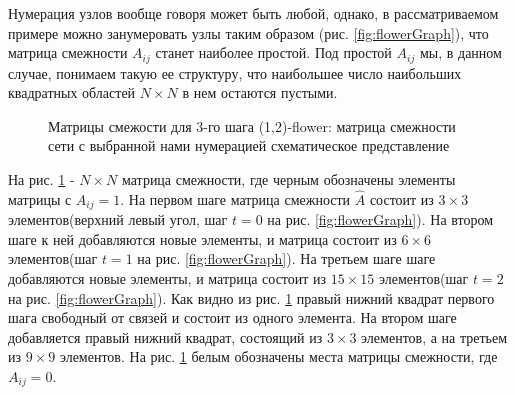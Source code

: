 \documentclass[10pt,aps,pra]{revtex4-1}
\begin{document}
Нумерация узлов вообще говоря может быть любой, однако, в рассматриваемом примере можно занумеровать узлы таким образом (рис. \ref{fig:flowerGraph}), что матрица смежности $A_{ij}$ станет наиболее простой. Под простой $A_{ij}$ мы, в данном случае, понимаем такую ее структуру, что наибольшее число наибольших квадратных областей $N \times N$ в нем остаются пустыми.


\begin{figure}[H]  

\centering
{}  

\caption{
\label{fig:flowerMatrix}
Матрицы смежости для 3-го шага (1,2)-flower:
  матрица смежности сети с выбранной нами нумерацией
 схематическое представление
}
\end{figure}

На рис. \ref{fig:flowerMatrix} - $N \times N$ матрица смежности, где черным обозначены элементы матрицы с $A_{ij}=1$. На первом шаге матрица смежности $\hat{A}$ состоит из $3 \times 3$ элементов(верхний левый угол, шаг $t=0$ на рис. \ref{fig:flowerGraph}). На втором шаге к ней добавляются новые элементы, и матрица состоит из $6 \times 6$ элементов(шаг $t=1$ на рис. \ref{fig:flowerGraph}). На третьем шаге шаге добавляются новые элементы, и матрица состоит из $15 \times 15$ элементов(шаг $t=2$ на рис. \ref{fig:flowerGraph}). Как видно из рис. \ref{fig:flowerMatrix} правый нижний квадрат первого шага свободный от связей и состоит из одного элемента. На втором шаге добавляется правый нижний квадрат, состоящий из $3 \times 3$ элементов, а на третьем из $9 \times 9$ элементов. На рис. \ref{fig:flowerMatrix} белым обозначены места матрицы смежности, где $A_{ij}=0$.
\end{document}
